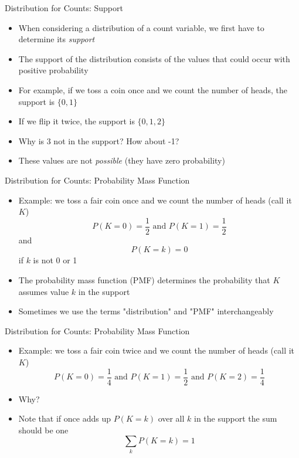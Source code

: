 \documentclass[xcolor=x11names,compress]{beamer}\usepackage[]{graphicx}\usepackage[]{color}
\begin{document}
\begin{frame}{Distribution for Counts: Support}
  \begin{itemize}
  \item When considering a distribution of a count variable, we first have to determine its {\it support}
  \item The support of the distribution consists of the values that could occur with positive probability
  \item For example, if we toss a coin once and we count the number of heads, the support is $\{0,1\}$
  \item If we flip it twice, the support is $\{0,1,2\}$
  \item Why is 3 not in the support? How about -1?
  \item These values are not {\it possible} (they have zero probability)
  \end{itemize}
\end{frame}
\begin{frame}{Distribution for Counts: Probability Mass Function}
  \begin{itemize}
  \item Example: we toss a fair coin once and we count the number of heads (call it $K$)
    \begin{equation*}
      P(K=0) = \frac{1}{2} \mbox{ and } P(K=1) = \frac{1}{2}
    \end{equation*}
  and 
   \begin{equation*}
      P(K=k) = 0 
    \end{equation*}
  if $k$ is not 0 or 1
  \item The probability mass function (PMF) determines the probability that $K$ assumes value $k$ in the support
  \item Sometimes we use the terms "distribution" and "PMF" interchangeably
  \end{itemize}
\end{frame}

\begin{frame}{Distribution for Counts: Probability Mass Function}
  \begin{itemize}
  \item Example: we toss a fair coin twice and we count the number of heads (call it $K$)
    \begin{equation*}
      P(K=0) = \frac{1}{4} \mbox{ and } P(K=1) = \frac{1}{2} \mbox{ and } P(K=2) = \frac{1}{4} 
    \end{equation*}
 \item Why?
    \item Note that if once adds up $P(K=k)$ over all $k$ in the support the sum should be one
      \begin{equation*}
        \sum_{k} P(K=k) =1
      \end{equation*}
  \end{itemize}
\end{frame}
\end{document}
